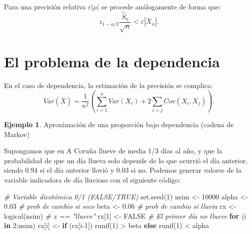 \documentclass[
]{book}
\newenvironment{Shaded}{\begin{snugshade}}{\end{snugshade}}
\newcommand{\CommentTok}[1]{\textcolor[rgb]{0.56,0.35,0.01}{\textit{#1}}}
\newcommand{\ConstantTok}[1]{\textcolor[rgb]{0.00,0.00,0.00}{#1}}
\newcommand{\ControlFlowTok}[1]{\textcolor[rgb]{0.13,0.29,0.53}{\textbf{#1}}}
\newcommand{\DecValTok}[1]{\textcolor[rgb]{0.00,0.00,0.81}{#1}}
\newcommand{\FloatTok}[1]{\textcolor[rgb]{0.00,0.00,0.81}{#1}}
\newcommand{\FunctionTok}[1]{\textcolor[rgb]{0.00,0.00,0.00}{#1}}
\newcommand{\NormalTok}[1]{#1}
\newcommand{\OtherTok}[1]{\textcolor[rgb]{0.56,0.35,0.01}{#1}}
\newcommand{\SpecialCharTok}[1]{\textcolor[rgb]{0.00,0.00,0.00}{#1}}
\theoremstyle{break}
\theoremstyle{definition}
\theoremstyle{definition}
\newtheorem{example}{Ejemplo}[chapter]
\theoremstyle{definition}
\theoremstyle{definition}
\theoremstyle{remark}
\begin{document}
Para una precisión relativa \(\varepsilon \left\vert \mu \right\vert\) se procede análogamente de forma que:
\[z_{1-\alpha /2}\dfrac{\widehat{S}_{n}}{\sqrt{n}}<\varepsilon \left\vert 
\overline{X}_{n}\right\vert .\]

\hypertarget{el-problema-de-la-dependencia}{%
\section{El problema de la dependencia}\label{el-problema-de-la-dependencia}}

En el caso de dependencia, la estimación de la precisión se complica:
\[Var\left( \overline{X}\right) =\frac{1}{n^{2}}\left( 
\sum_{i=1}^{n}Var\left( X_{i} \right) + 2\sum_{i<j}Cov\left( X_{i},X_{j}\right) \right).\]

\begin{example}
\protect\hypertarget{exm:mmc}{}{\label{exm:mmc} }Aproximación de una proporción bajo dependencia (cadena de Markov)
\end{example}
Supongamos que en A Coruña llueve de media 1/3 días al año,
y que la probabilidad de que un día llueva solo depende de lo que ocurrió el día anterior,
siendo 0.94 si el día anterior llovió y 0.03 si no.
Podemos generar valores de la variable indicadora de día lluvioso con el siguiente código:

\begin{Shaded}
\begin{Highlighting}[]
\CommentTok{\# Variable dicotómica 0/1 (FALSE/TRUE)  }
\FunctionTok{set.seed}\NormalTok{(}\DecValTok{1}\NormalTok{)}
\NormalTok{nsim }\OtherTok{\textless{}{-}} \DecValTok{10000}
\NormalTok{alpha }\OtherTok{\textless{}{-}} \FloatTok{0.03} \CommentTok{\# prob de cambio si seco}
\NormalTok{beta }\OtherTok{\textless{}{-}} \FloatTok{0.06}  \CommentTok{\# prob de cambio si lluvia}
\NormalTok{rx }\OtherTok{\textless{}{-}} \FunctionTok{logical}\NormalTok{(nsim) }\CommentTok{\# x == "llueve"}
\NormalTok{rx[}\DecValTok{1}\NormalTok{] }\OtherTok{\textless{}{-}} \ConstantTok{FALSE} \CommentTok{\# El primer día no llueve}
\ControlFlowTok{for}\NormalTok{ (i }\ControlFlowTok{in} \DecValTok{2}\SpecialCharTok{:}\NormalTok{nsim)}
\NormalTok{  rx[i] }\OtherTok{\textless{}{-}} \ControlFlowTok{if}\NormalTok{ (rx[i}\DecValTok{{-}1}\NormalTok{]) }\FunctionTok{runif}\NormalTok{(}\DecValTok{1}\NormalTok{) }\SpecialCharTok{\textgreater{}}\NormalTok{ beta }\ControlFlowTok{else} \FunctionTok{runif}\NormalTok{(}\DecValTok{1}\NormalTok{) }\SpecialCharTok{\textless{}}\NormalTok{ alpha}
\end{Highlighting}
\end{Shaded}
\end{document}
